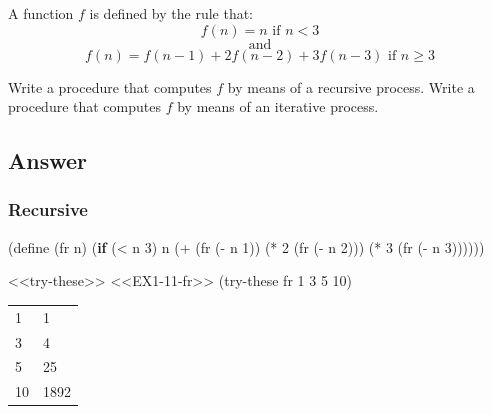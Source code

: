 \documentclass[
]{article}
\newenvironment{Shaded}{}{}
\newcommand{\DecValTok}[1]{\textcolor[rgb]{0.25,0.63,0.44}{#1}}
\newcommand{\ExtensionTok}[1]{#1}
\newcommand{\FunctionTok}[1]{\textcolor[rgb]{0.02,0.16,0.49}{#1}}
\newcommand{\KeywordTok}[1]{\textcolor[rgb]{0.00,0.44,0.13}{\textbf{#1}}}
\newcommand{\NormalTok}[1]{#1}
\newcommand{\OperatorTok}[1]{\textcolor[rgb]{0.40,0.40,0.40}{#1}}
\begin{document}
A function \(f\) is defined by the rule that: \[
f(n)=n \text{ if } n<3
\] \[
\text{ and }
\] \[
f(n)=f(n-1)+2f(n-2)+3f(n-3) \text{ if } n \geq 3
\]

Write a procedure that computes \(f\) by means of a recursive process.
Write a procedure that computes \(f\) by means of an iterative process.

\hypertarget{answer-10}{%
\subsection{Answer}\label{answer-10}}

\hypertarget{recursive}{%
\subsubsection{Recursive}\label{recursive}}

\hypertarget{EX1-11-fr}{%
\label{EX1-11-fr}}%
\begin{Shaded}
\begin{Highlighting}[numbers=left,,]
\NormalTok{(}\ExtensionTok{define}\FunctionTok{ }\NormalTok{(fr n)}
\NormalTok{  (}\KeywordTok{if}\NormalTok{ (}\OperatorTok{\textless{}}\NormalTok{ n }\DecValTok{3}\NormalTok{)}
\NormalTok{      n}
\NormalTok{      (}\OperatorTok{+}\NormalTok{      (fr (}\OperatorTok{{-}}\NormalTok{ n }\DecValTok{1}\NormalTok{))}
\NormalTok{         (}\OperatorTok{*} \DecValTok{2}\NormalTok{ (fr (}\OperatorTok{{-}}\NormalTok{ n }\DecValTok{2}\NormalTok{)))}
\NormalTok{         (}\OperatorTok{*} \DecValTok{3}\NormalTok{ (fr (}\OperatorTok{{-}}\NormalTok{ n }\DecValTok{3}\NormalTok{))))))}
\end{Highlighting}
\end{Shaded}

\begin{Shaded}
\begin{Highlighting}[numbers=left,,]
\NormalTok{\textless{}\textless{}try{-}these\textgreater{}\textgreater{}}
\NormalTok{\textless{}\textless{}EX1{-}11{-}fr\textgreater{}\textgreater{}}
\NormalTok{(try{-}these fr }\DecValTok{1} \DecValTok{3} \DecValTok{5} \DecValTok{10}\NormalTok{)}
\end{Highlighting}
\end{Shaded}

\begin{longtable}[]{@{}ll@{}}
\toprule
\endhead
1 & 1 \\
3 & 4 \\
5 & 25 \\
10 & 1892 \\
\bottomrule
\end{longtable}
\end{document}
